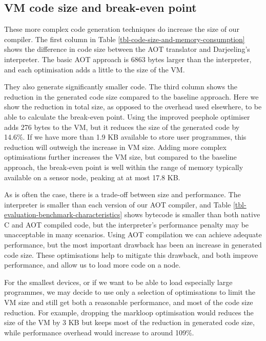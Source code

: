 \subsection{VM code size and break-even point}
\label{sec-code-size-break-even}
These more complex code generation techniques do increase the size of our compiler. The first column in Table \ref{tbl-code-size-and-memory-consumption} shows the difference in code size between the AOT translator and Darjeeling's interpreter. The basic AOT approach is 6863 bytes larger than the interpreter, and each optimisation adds a little to the size of the VM.

They also generate significantly smaller code. The third column shows the reduction in the generated code size compared to the baseline approach. Here we show the reduction in total size, as opposed to the overhead used elsewhere, to be able to calculate the break-even point. Using the improved peephole optimiser adds 276 bytes to the VM, but it reduces the size of the generated code by 14.6\%. If we have more than 1.9 KB available to store user programmes, this reduction will outweigh the increase in VM size. Adding more complex optimisations further increases the VM size, but compared to the baseline approach, the break-even point is well within the range of memory typically available on a sensor node, peaking at at most 17.8 KB.

As is often the case, there is a trade-off between size and performance. The interpreter is smaller than each version of our AOT compiler, and Table \ref{tbl-evaluation-benchmark-characteristics} shows bytecode is smaller than both native C and AOT compiled code, but the interpreter's performance penalty may be unacceptable in many scenarios. Using AOT compilation we can achieve adequate performance, but the most important drawback has been an increase in generated code size. These optimisations help to mitigate this drawback, and both improve performance, and allow us to load more code on a node.

For the smallest devices, or if we want to be able to load especially large programmes, we may decide to use only a selection of optimisations to limit the VM size and still get both a reasonable performance, and most of the code size reduction. For example, dropping the markloop optimisation would reduces the size of the VM by 3 KB but keeps most of the reduction in generated code size, while performance overhead would increase to around 109\%.



